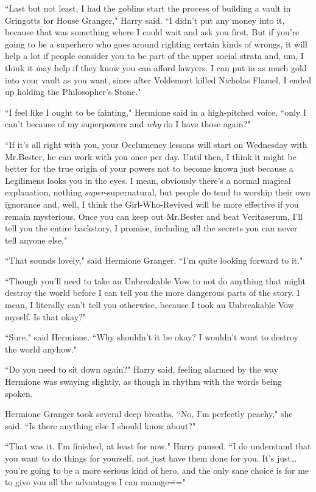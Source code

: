 ``Last but not least, I had the goblins start the process of building a vault in Gringotts for House Granger," Harry said. ``I didn't put any money into it, because that was something where I could wait and ask you first. But if you're going to be a superhero who goes around righting certain kinds of wrongs, it will help a lot if people consider you to be part of the upper social strata and, um, I think it may help if they know you can afford lawyers. I can put in as much gold into your vault as you want, since after Voldemort killed Nicholas Flamel, I ended up holding the Philosopher's Stone."

``I feel like I ought to be fainting," Hermione said in a high-pitched voice, ``only I can't because of my superpowers and \emph{why} do I have those again?"

``If it's all right with you, your Occlumency lessons will start on Wednesday with Mr.\?Bester, he can work with you once per day. Until then, I think it might be better for the true origin of your powers not to become known just because a Legilimens looks you in the eyes. I mean, obviously there's a normal magical explanation, nothing \emph{super}-supernatural, but people do tend to worship their own ignorance and, well, I think the Girl-Who-Revived will be more effective if you remain mysterious. Once you can keep out Mr.\?Bester and beat Veritaserum, I'll tell you the entire backstory, I promise, including all the secrets you can never tell anyone else."

``That sounds lovely," said Hermione Granger. ``I'm quite looking forward to it."

``Though you'll need to take an Unbreakable Vow to not do anything that might destroy the world before I can tell you the more dangerous parts of the story. I mean, I literally can't tell you otherwise, because I took an Unbreakable Vow myself. Is that okay?"

``Sure," said Hermione. ``Why shouldn't it be okay? I wouldn't want to destroy the world anyhow."

``Do you need to sit down again?" Harry said, feeling alarmed by the way Hermione was swaying slightly, as though in rhythm with the words being spoken.

Hermione Granger took several deep breaths. ``No, I'm perfectly peachy," she said. ``Is there anything else I should know about?"

``That was it. I'm finished, at least for now." Harry paused. ``I do understand that you want to do things for yourself, not just have them done for you. It's just{\ldots} you're going to be a more serious kind of hero, and the only sane choice is for me to give you all the advantages I can manage\==="


